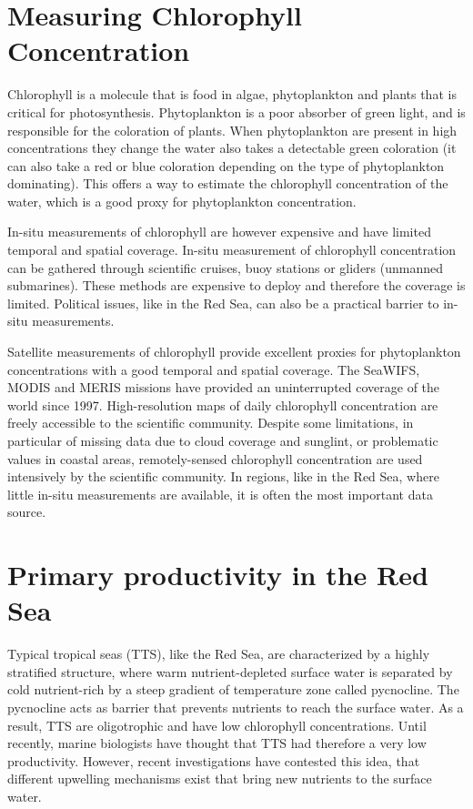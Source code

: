 \section{Measuring Chlorophyll Concentration}

Chlorophyll is a molecule that is food in algae, phytoplankton and plants that is critical for photosynthesis. Phytoplankton is a poor absorber of green light, and is responsible for the coloration of plants. When phytoplankton are present in high concentrations they change the water also takes a detectable green coloration (it can also take a red or blue coloration depending on the type of phytoplankton dominating). This offers a way to estimate the chlorophyll concentration of the water, which is a good proxy for phytoplankton concentration. 

In-situ measurements of chlorophyll are however expensive and have limited temporal and spatial coverage. In-situ measurement of chlorophyll concentration can be gathered through scientific cruises, buoy stations or gliders (unmanned submarines). These methods are expensive to deploy and therefore the coverage is limited. Political issues, like in the Red Sea, can also be a practical barrier to in-situ measurements. 

Satellite measurements of chlorophyll provide excellent proxies for phytoplankton concentrations with a good temporal and spatial coverage. The SeaWIFS, MODIS and MERIS missions have provided an uninterrupted coverage of the world since 1997. High-resolution maps of daily chlorophyll concentration are freely accessible to the scientific community. Despite some limitations, in particular of missing data due to cloud coverage and sunglint, or problematic values in coastal areas, remotely-sensed chlorophyll concentration are used intensively by the scientific community. In regions, like in the Red Sea, where little in-situ measurements are available, it is often the most important data source. 

\section{Primary productivity in the Red Sea}

Typical tropical seas (TTS), like the Red Sea, are characterized by a highly stratified structure, where warm nutrient-depleted surface water is separated by cold nutrient-rich by a steep gradient of temperature zone called pycnocline. The pycnocline acts as barrier that prevents nutrients to reach the surface water. As a result, TTS are oligotrophic and have low chlorophyll concentrations. Until recently, marine biologists have thought that TTS had therefore a very low productivity. However, recent investigations have contested this idea, that different upwelling mechanisms exist that bring new nutrients to the surface water. 

